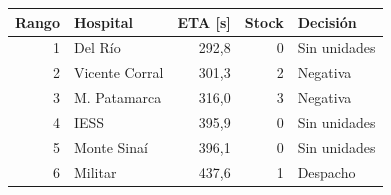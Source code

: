 \begin{tabular}{rlrrl}
\toprule
Rango & Hospital & ETA [s] & Stock & Decisión \\
\midrule
1 & Del Río & 292,8 & 0 & Sin unidades \\
2 & Vicente Corral & 301,3 & 2 & Negativa \\
3 & M. Patamarca & 316,0 & 3 & Negativa \\
4 & IESS & 395,9 & 0 & Sin unidades \\
5 & Monte Sinaí & 396,1 & 0 & Sin unidades \\
6 & Militar & 437,6 & 1 & Despacho \\
\bottomrule
\end{tabular}
